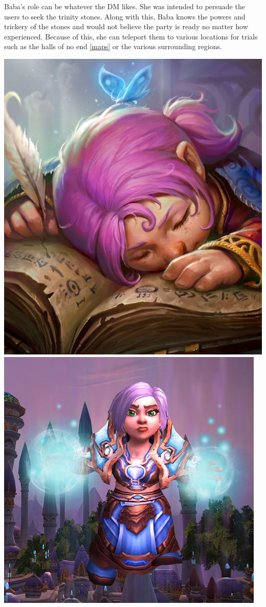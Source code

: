 Baba's role can be whatever the DM likes. She was intended to persuade the users to seek the trinity stones. Along with this, Baba knows the powers and trickery of the stones and would not believe the party is ready no matter how experienced. Because of this, she can teleport them to various locations for trials such as the halls of no end \ref{maps} or the various surrounding regions. 

\begin{center}
	\includegraphics[width=0.455
	\linewidth]{img/WoW/baba.jpg} \includegraphics[width=0.53\linewidth]{img/WoW/S46KEIUDZE1U1446614218885.jpg}
\end{center}

